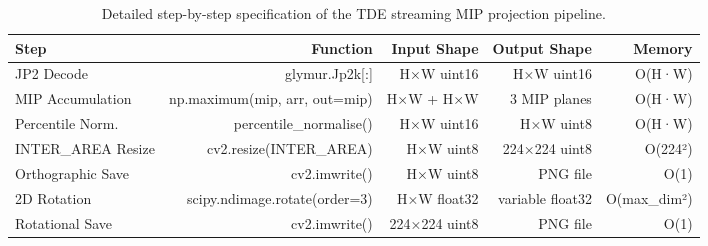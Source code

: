 \begin{table}[htbp]
\caption{Detailed step-by-step specification of the TDE streaming MIP projection pipeline.}
\label{tab:projection_pipeline}
\begin{tabular}{lrrrr}
\toprule
Step & Function & Input Shape & Output Shape & Memory \\
\midrule
JP2 Decode & glymur.Jp2k[:] & H×W uint16 & H×W uint16 & O(H·W) \\
MIP Accumulation & np.maximum(mip, arr, out=mip) & H×W + H×W & 3 MIP planes & O(H·W) \\
Percentile Norm. & percentile\_normalise() & H×W uint16 & H×W uint8 & O(H·W) \\
INTER\_AREA Resize & cv2.resize(INTER\_AREA) & H×W uint8 & 224×224 uint8 & O(224²) \\
Orthographic Save & cv2.imwrite() & H×W uint8 & PNG file & O(1) \\
2D Rotation & scipy.ndimage.rotate(order=3) & H×W float32 & variable float32 & O(max\_dim²) \\
Rotational Save & cv2.imwrite() & 224×224 uint8 & PNG file & O(1) \\
\bottomrule
\end{tabular}
\end{table}
